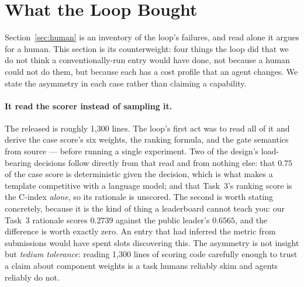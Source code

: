 %
%
%

\section{What the Loop Bought}
\label{sec:gained}

Section~\ref{sec:human} is an inventory of the loop's failures, and read alone it
argues for a human. This section is its counterweight: four things the loop did that
we do not think a conventionally-run entry would have done, not because a human
could not do them, but because each has a cost profile that an agent changes. We
state the asymmetry in each case rather than claiming a capability.

\paragraph{It read the scorer instead of sampling it.}
The released  is roughly 1{,}300 lines. The loop's first act was to
read all of it and derive the case score's six weights, the ranking formula, and the
gate semantics from source --- before running a single experiment. Two of the
design's load-bearing decisions follow directly from that read and from nothing else:
that $0.75$ of the case score is deterministic given the decision, which is what
makes a template competitive with a language model; and that Task~3's ranking score
is the C-index \emph{alone}, so its rationale is unscored. The second is worth
stating concretely, because it is the kind of thing a leaderboard cannot teach you:
our Task~3 rationale scores $0.2739$ against the public leader's $0.6565$, and the
difference is worth exactly zero. An entry that had inferred the metric from
submissions would have spent slots discovering this. The asymmetry is not insight
but \emph{tedium tolerance}: reading 1{,}300 lines of scoring code carefully enough
to trust a claim about component weights is a task humans reliably skim and agents
reliably do not.


